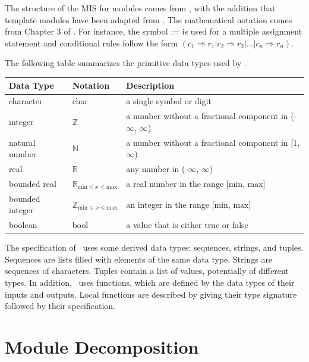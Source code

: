 \documentclass[12pt, titlepage]{article}
\begin{document}

The structure of the MIS for modules comes from \citet{HoffmanAndStrooper1995},
with the addition that template modules have been adapted from
\cite{GhezziEtAl2003}.  The mathematical notation comes from Chapter 3 of
\citet{HoffmanAndStrooper1995}.  For instance, the symbol := is used for a
multiple assignment statement and conditional rules follow the form $(c_1
\Rightarrow r_1 | c_2 \Rightarrow r_2 | ... | c_n \Rightarrow r_n )$.

The following table summarizes the primitive data types used by \progname. 

\begin{center}
\renewcommand{\arraystretch}{1.2}
\noindent 
\begin{tabular}{l l p{7.5cm}} 
\toprule 
\textbf{Data Type} & \textbf{Notation} & \textbf{Description}\\ 
\midrule
character & char & a single symbol or digit\\
integer & $\mathbb{Z}$ & a number without a fractional component in (-$\infty$, $\infty$) \\
natural number & $\mathbb{N}$ & a number without a fractional component in [1, $\infty$) \\
real & $\mathbb{R}$ & any number in (-$\infty$, $\infty$)\\
bounded real & $\mathbb{R}_{\text{min} \leq x \leq \text{max}}$ & a real number in the range [$\text{min}$, $\text{max}$]\\
bounded integer & $\mathbb{Z}_{\text{min} \leq x \leq \text{max}}$ & an integer in the range [$\text{min}$, $\text{max}$]\\
boolean & bool & a value that is either true or false\\
\bottomrule
\end{tabular} 
\end{center}

\noindent
The specification of \progname \ uses some derived data types: sequences, strings, and
tuples. Sequences are lists filled with elements of the same data type. Strings
are sequences of characters. Tuples contain a list of values, potentially of
different types. In addition, \progname \ uses functions, which
are defined by the data types of their inputs and outputs. Local functions are
described by giving their type signature followed by their specification.

\section{Module Decomposition}
\end{document}
